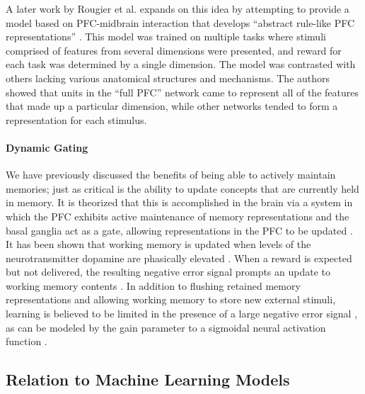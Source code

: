 \documentclass[10pt,letterpaper]{article}
\begin{document}
A later work by Rougier et al. expands on this idea by attempting to provide a model based on PFC-midbrain interaction that develops ``abstract rule-like PFC representations'' \cite{rougier_prefrontal_2005}. This model was trained on multiple tasks where stimuli comprised of features from several dimensions were presented, and reward for each task was determined by a single dimension. The model was contrasted with others lacking various anatomical structures and mechanisms. The authors showed that units in the ``full PFC'' network came to represent all of the features that made up a particular dimension, while other networks tended to form a representation for each stimulus.

\paragraph{Dynamic Gating}

We have previously discussed the benefits of being able to actively maintain memories; just as critical is the ability to update concepts that are currently held in memory. It is theorized that this is accomplished in the brain via a system in which the PFC exhibits active maintenance of memory representations and the basal ganglia act as a gate, allowing representations in the PFC to be updated \cite{frank_interactions_2001,chatham_multiple_2015,chatham_corticostriatal_2014,rougier_prefrontal_2005,kriete_indirection_2013,kriete_generalisation_2011}. It has been shown that working memory is updated when levels of the neurotransmitter dopamine are phasically elevated \cite{frank_interactions_2001,chatham_multiple_2015,kriete_generalisation_2011,rougier_prefrontal_2005,niv_reinforcement_2015,rafati_lateral_2015}. When a reward is expected but not delivered, the resulting negative error signal prompts an update to working memory contents \cite{oreilly_prefrontal_2002}. In addition to flushing retained memory representations and allowing working memory to store new external stimuli, learning is believed to be limited in the presence of a large negative error signal \cite{chatham_multiple_2015,oreilly_biologically_2006}, as can be modeled by the gain parameter to a sigmoidal neural activation function \cite{frank_interactions_2001,oreilly_making_2006}.

\subsection{Relation to Machine Learning Models}
\end{document}
